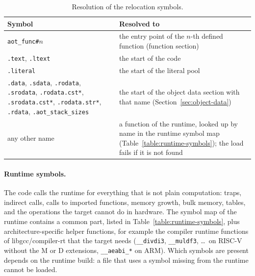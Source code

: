 \documentclass{article}
\begin{document}
\begin{table}[H]
\centering
\begin{tabular}{p{4.6cm}p{8.4cm}}
    \hline
    Symbol & Resolved to \\
    \hline
    \verb|aot_func#|$n$ & the entry point of the $n$-th defined function (function section) \\
    \verb|.text|, \verb|.ltext| & the start of the code \\
    \verb|.literal| & the start of the literal pool \\
    \verb|.data|, \verb|.sdata|, \verb|.rodata|, \verb|.srodata|, \verb|.rodata.cst*|, \verb|.srodata.cst*|, \verb|.rodata.str*|, \verb|.rdata|, \verb|.aot_stack_sizes| & the start of the object data section with that name (Section~\ref{sec:object-data}) \\
    any other name & a function of the runtime, looked up by name in the runtime symbol map (Table~\ref{table:runtime-symbols}); the load fails if it is not found \\
    \hline
\end{tabular}
\caption{Resolution of the relocation symbols.}
\label{table:symbol-resolution}
\end{table}

\paragraph{Runtime symbols.}
The code calls the runtime for everything that is not plain computation: traps, indirect calls, calls to imported functions, memory growth, bulk memory, tables, and the operations the target cannot do in hardware.
The symbol map of the runtime contains a common part, listed in Table~\ref{table:runtime-symbols}, plus architecture-specific helper functions, for example the compiler runtime functions of libgcc/compiler-rt that the target needs (\verb|__divdi3|, \verb|__muldf3|, \dots\ on RISC-V without the M or D extensions, \verb|__aeabi_*| on ARM).
Which symbols are present depends on the runtime build: a file that uses a symbol missing from the runtime cannot be loaded.
\end{document}
